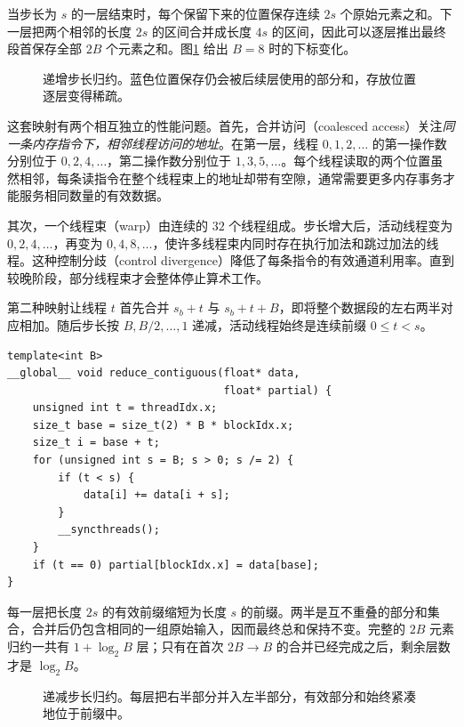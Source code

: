 当步长为 $s$ 的一层结束时，每个保留下来的位置保存连续 $2s$ 个原始元素之和。下一层把两个相邻的长度 $2s$ 的区间合并成长度 $4s$ 的区间，因此可以逐层推出最终段首保存全部 $2B$ 个元素之和。图\ref{l15:fig:increasing} 给出 $B=8$ 时的下标变化。

\begin{figure}[htbp]
\centering

\caption{递增步长归约。蓝色位置保存仍会被后续层使用的部分和，存放位置逐层变得稀疏。}
\label{l15:fig:increasing}
\end{figure}

这套映射有两个相互独立的性能问题。首先，合并访问（coalesced access）关注\emph{同一条内存指令下，相邻线程访问的地址}。在第一层，线程 $0,1,2,\ldots$ 的第一操作数分别位于 $0,2,4,\ldots$，第二操作数分别位于 $1,3,5,\ldots$。每个线程读取的两个位置虽然相邻，每条读指令在整个线程束上的地址却带有空隙，通常需要更多内存事务才能服务相同数量的有效数据。

其次，一个线程束（warp）由连续的 $32$ 个线程组成。步长增大后，活动线程变为 $0,2,4,\ldots$，再变为 $0,4,8,\ldots$，使许多线程束内同时存在执行加法和跳过加法的线程。这种控制分歧（control divergence）降低了每条指令的有效通道利用率。直到较晚阶段，部分线程束才会整体停止算术工作。

第二种映射让线程 $t$ 首先合并 $s_b+t$ 与 $s_b+t+B$，即将整个数据段的左右两半对应相加。随后步长按 $B,B/2,\ldots,1$ 递减，活动线程始终是连续前缀 $0\leq t<s$。

\noindent\begin{minipage}{\linewidth}
\begin{lstlisting}[caption={递减步长：使活动线程和保存位置保持连续},label={l15:lst:code2}]
template<int B>
__global__ void reduce_contiguous(float* data,
                                  float* partial) {
    unsigned int t = threadIdx.x;
    size_t base = size_t(2) * B * blockIdx.x;
    size_t i = base + t;
    for (unsigned int s = B; s > 0; s /= 2) {
        if (t < s) {
            data[i] += data[i + s];
        }
        __syncthreads();
    }
    if (t == 0) partial[blockIdx.x] = data[base];
}
\end{lstlisting}
\end{minipage}

每一层把长度 $2s$ 的有效前缀缩短为长度 $s$ 的前缀。两半是互不重叠的部分和集合，合并后仍包含相同的一组原始输入，因而最终总和保持不变。完整的 $2B$ 元素归约一共有 $1+\log_2B$ 层；只有在首次 $2B\to B$ 的合并已经完成之后，剩余层数才是 $\log_2B$。

\begin{figure}[htbp]
\centering

\caption{递减步长归约。每层把右半部分并入左半部分，有效部分和始终紧凑地位于前缀中。}
\label{l15:fig:decreasing}
\end{figure}

